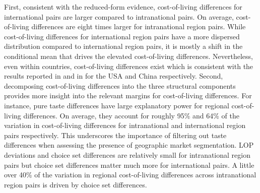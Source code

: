 First, consistent with the reduced-form evidence, cost-of-living differences for international pairs are larger compared to intranational pairs. On average, cost-of-living differences are eight times larger for intranational region pairs. While cost-of-living differences for international region pairs have a more dispersed distribution compared to international region pairs, it is mostly a shift in the conditional mean that drives the elevated cost-of-living differences. Nevertheless, even within countries, cost-of-living differences exist which is consistent with the results reported in \citet{Handbury2015} and in \citet{Feenstra2020} for the USA and China respectively. Second, decomposing cost-of-living differences into the three structural components provides more insight into the relevant margins for cost-of-living differences. For instance, pure taste differences have large explanatory power for regional cost-of-living differences. On average, they account for roughly 95\% and 64\% of the variation in cost-of-living differences for intranational and international region pairs respectively. This underscores the importance of filtering out taste differences when assessing the presence of geographic market segmentation. LOP deviations and choice set differences are relatively small for intranational region pairs but choice set differences matter much more for international pairs. A little over 40\% of the variation in regional cost-of-living differences across intranational region pairs is driven by choice set differences.  
 
